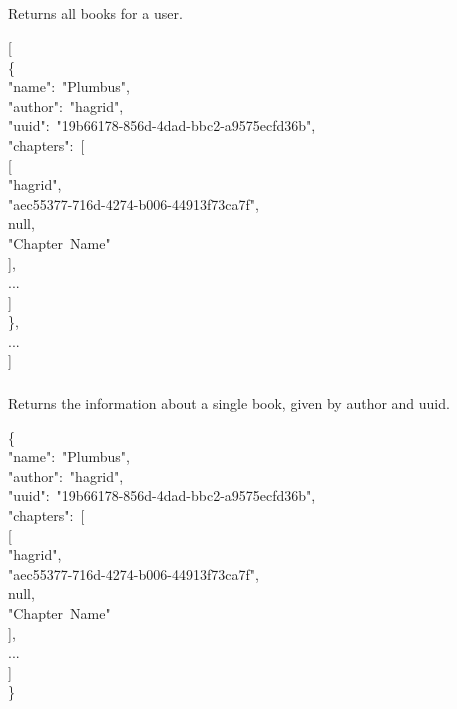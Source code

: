 \documentclass[onecolumn, draftclsnofoot, 10pt, compsoc]{IEEEtran}
\begin{document}
\subsection{}\label{sec-books}%

\subsubsection{}\label{sec-get-booksauthor}%

\noindent Returns all books for a user.%
\begin{mdpre}%
\noindent{}[\\
\{\\
"name":~"Plumbus",\\
"author":~"hagrid",\\
"uuid":~"19b66178-856d-4dad-bbc2-a9575ecfd36b",\\
"chapters":~{}[\\
[\\
"hagrid",\\
"aec55377-716d-4274-b006-44913f73ca7f",\\
null,\\
"Chapter~Name"\\
],\\
...\\
]\\
\},\\
...\\
]%
\end{mdpre}
\subsubsection{}\label{sec-get-booksauthoruuid}%

\noindent Returns the information about a single book, given by author and uuid.%
\begin{mdpre}%
\noindent\{\\
"name":~"Plumbus",\\
"author":~"hagrid",\\
"uuid":~"19b66178-856d-4dad-bbc2-a9575ecfd36b",\\
"chapters":~{}[\\
[\\
"hagrid",\\
"aec55377-716d-4274-b006-44913f73ca7f",\\
null,\\
"Chapter~Name"\\
],\\
...\\
]\\
\}%
\end{mdpre}
\end{document}
